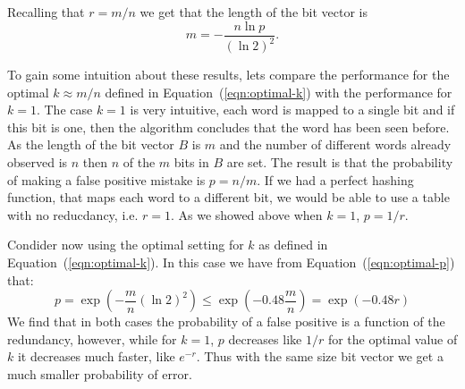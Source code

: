 Recalling  that $r=m/n$ we get that the length of the bit vector is
\[m=-\frac{n\ln p}{(\ln 2)^2}.\]

To gain some intuition about these results, lets compare the
performance for the optimal $k\approx m/n$ defined in
Equation~(\ref{eqn:optimal-k}) with the performance for $k=1$.  The case
$k=1$ is very intuitive, each word is mapped to a single bit and if
this bit is one, then the algorithm concludes that the word has been
seen before. As the length of the bit vector $B$ is $m$ and the number
of different words already observed is $n$ then $n$ of the $m$ bits in
$B$ are set. The result is that the probability of making a false
positive mistake is $p=n/m$. If we had a perfect hashing
function, that maps each word to a different bit, we would be able to
use a table with no reducdancy, i.e. $r=1$. As we showed above when
$k=1$, $p=1/r$.

Condider now using the optimal setting for $k$ as defined in
Equation~(\ref{eqn:optimal-k}). In this case we have from
Equation~(\ref{eqn:optimal-p}) that:
\[
p = \exp\left( -\frac{m}{n} \left(\ln 2\right)^2 \right) \leq
    \exp\left( -0.48 \frac{m}{n} \right)
=  \exp\left( -0.48 r \right)
\]
We find that in both cases the probability of a false positive is a
function of the redundancy, however, while for $k=1$, $p$ decreases
like $1/r$ for the optimal value of $k$ it decreases much faster, like $e^{-r}$.
Thus with the same size bit vector we get a much smaller probability
of error.





